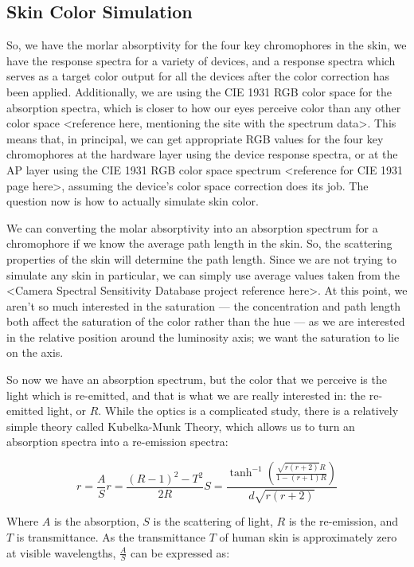 \subsection{Skin Color Simulation}

So, we have the morlar absorptivity for the four key chromophores in the skin, we have the response spectra for a variety of devices, and a response spectra which serves as a target color output for all the devices after the color correction has been applied. Additionally, we are using the CIE 1931 RGB color space for the absorption spectra, which is closer to how our eyes perceive color than any other color space <reference here, mentioning the site with the spectrum data>. This means that, in principal, we can get appropriate RGB values for the four key chromophores at the hardware layer using the device response spectra, or at the AP layer using the CIE 1931 RGB color space spectrum <reference for CIE 1931 page here>, assuming the device's color space correction does its job. The question now is how to actually simulate skin color.

We can converting the molar absorptivity into an absorption spectrum for a chromophore if we know the average path length in the skin. So, the scattering properties of the skin will determine the path length. Since we are not trying to simulate any skin in particular, we can simply use average values taken from the <Camera Spectral Sensitivity Database project reference here>. At this point, we aren't so much interested in the saturation --- the concentration and path length both affect the saturation of the color rather than the hue --- as we are interested in the relative position around the luminosity axis; we want the saturation to lie on the axis.

So now we have an absorption spectrum, but the color that we perceive is the light which is re-emitted, and that is what we are really interested in: the re-emitted light, or $R$. While the optics is a complicated study, there is a relatively simple theory called Kubelka-Munk Theory, which allows us to turn an absorption spectra into a re-emission spectra:

\begin{equation}\label{eq:KubelkaMunk}
r=\frac{A}{S}
r=\frac{(R-1)^2-T^2}{2 R}
S=\frac{\tanh ^{-1}\left(\frac{\sqrt{r (r+2)} R}{1-(r+1) R}\right)}{d \sqrt{r (r+2)}}
\end{equation}

Where $A$ is the absorption, $S$ is the scattering of light, $R$ is the re-emission, and $T$ is transmittance. As the transmittance $T$ of human skin is approximately zero at visible wavelengths, $\frac{A}{S}$ can be expressed as:

